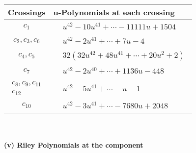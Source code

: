 \documentclass[1p]{elsarticle_modified}
\theoremstyle{definition}
\begin{document}
\begin{tabular}{m{50pt}|m{274pt}}
Crossings & \hspace{64pt}u-Polynomials at each crossing \\
\hline $$\begin{aligned}c_{1}\end{aligned}$$&$\begin{aligned}
&u^{42}-10 u^{41}+\cdots-11111 u+1504
\end{aligned}$\\
\hline $$\begin{aligned}c_{2},c_{3},c_{6}\end{aligned}$$&$\begin{aligned}
&u^{42}-2 u^{41}+\cdots+7 u-4
\end{aligned}$\\
\hline $$\begin{aligned}c_{4},c_{5}\end{aligned}$$&$\begin{aligned}
&32(32 u^{42}+48 u^{41}+\cdots+20 u^2+2)
\end{aligned}$\\
\hline $$\begin{aligned}c_{7}\end{aligned}$$&$\begin{aligned}
&u^{42}-2 u^{40}+\cdots+1136 u-448
\end{aligned}$\\
\hline $$\begin{aligned}c_{8},c_{9},c_{11}\\c_{12}\end{aligned}$$&$\begin{aligned}
&u^{42}-5 u^{41}+\cdots- u-1
\end{aligned}$\\
\hline $$\begin{aligned}c_{10}\end{aligned}$$&$\begin{aligned}
&u^{42}-3 u^{41}+\cdots-7680 u+2048
\end{aligned}$\\
\hline
\end{tabular}\\~\\
\newpage\renewcommand{\arraystretch}{1}
\flushleft \textbf{(v) Riley Polynomials at the component}\newline \\
\end{document}
